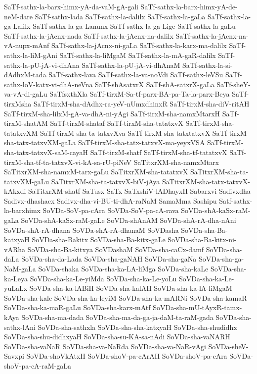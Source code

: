 {SaTf-sathx-la-barx-himx-yA-da-vaM-gA-gali
SaTf-sathx-la-barx-himx-yA-de-neM-dare
SaTf-sathx-lada
SaTf-sathx-la-dalilx
SaTf-sathx-la-gaLa
SaTf-sathx-la-ga-Lalilx
SaTf-sathx-la-ga-Lanunx
SaTf-sathx-la-ga-Lige
SaTf-sathx-la-gaLu
SaTf-sathx-la-jAcnx-nada
SaTf-sathx-la-jAcnx-na-dalilx
SaTf-sathx-la-jAcnx-na-vA-nupx-mAnf
SaTf-sathx-la-jAcnx-ni-gaLa
SaTf-sathx-la-karx-ma-dalilx
SaTf-sathx-la-liM-gAni
SaTf-sathx-la-liMgaM
SaTf-sathx-la-mA-gaR-dalilx
SaTf-sathx-la-pU-jA-vi-dhAna
SaTf-sathx-la-pU-jA-vi-dhAnaM
SaTf-sathx-la-si-dAdhxM-tada
SaTf-sathx-lava
SaTf-sathx-la-va-noVdi
SaTf-sathx-leVSu
SaTf-sathx-loV-katx-vi-dhA-neVna
SaTf-shAsatxrX
SaTf-shA-satxrX-gaLa
SaTf-sheY-va-vA-di-gaLu
SaTfsxthXla
SaTf-tirxM-Sa-tf-parx-BA-pa-Ta-la-parx-Beya
SaTf-tirxMsha
SaTf-tirxM-sha-dAdhx-ra-yeV-nUmxdhinxR
SaTf-tirxM-sha-diV-ritAH
SaTf-tirxM-sha-lilxM-gA-va-dhA-ni-yAgi
SaTf-tirxM-sha-namxMtarxH
SaTf-tirxM-shatAM
SaTf-tirxM-shataf
SaTf-tirxM-sha-tatatxvX
SaTf-tirxM-sha-tatatxvXM
SaTf-tirxM-sha-ta-tatxvXva
SaTf-tirxM-sha-tatxtatxvX
SaTf-tirxM-sha-tatx-tatxvXM-gaLa
SaTf-tirxM-sha-tatx-tatxvX-ma-yeyxVSA
SaTf-tirxM-sha-tatx-tatxvX-saM-cayaH
SaTf-tirxM-shatf
SaTf-tirxM-sha-tf-tatatxvX
SaTf-tirxM-sha-tf-ta-tatxvX-vi-kA-sa-rU-piNeV
SaTitxrXM-sha-namxMtarx
SaTitxrXM-sha-namxM-tarx-gaLu
SaTitxrXM-sha-tatatxvX
SaTitxrXM-sha-ta-tatxvXM-gaLu
SaTitxrXM-sha-ta-tatxvX-biV-jAya
SaTitxrXM-sha-tatx-tatxvX-kAkxdi
SaTitxrXM-shatf
SaTusx
SaTx
SaTxshiV-lADhayxH
Sabarxvi
Sadivxdha
Sadivx-dhashacx
Sadivx-dha-vi-BU-ti-dhA-raNaM
SamaMma
Sashipu
Satf-sathx-la-barxhimx
SoVDa-SoV-pa-cAra
SoVDa-SoV-pa-cA-rava
SoVDa-shA-kaSx-raM-gaLa
SoVDa-shA-kaSx-raM-gaLe
SoVDa-shAnAM
SoVDa-shA-rA-dha-nAni
SoVDa-shA-rA-dhana
SoVDa-shA-rA-dhanaM
SoVDasha
SoVDa-sha-Ba-katxyaH
SoVDa-sha-Bakitx
SoVDa-sha-Ba-kitx-gaLe
SoVDa-sha-Ba-kitx-ni-vARha
SoVDa-sha-Ba-kitxya
SoVDashaM
SoVDa-sha-caCx-damf
SoVDa-sha-daLa
SoVDa-sha-da-Lada
SoVDa-sha-gaNAH
SoVDa-sha-gaNa
SoVDa-sha-ga-NaM-gaLa
SoVDa-shaka
SoVDa-sha-ka-LA-liMga
SoVDa-sha-kaLe
SoVDa-sha-ka-Leya
SoVDa-sha-ka-Le-yiMda
SoVDa-sha-ka-Le-yoLu
SoVDa-sha-ka-Le-yuLaLx
SoVDa-sha-ka-lABiH
SoVDa-sha-kalAH
SoVDa-sha-ka-lA-liMgaM
SoVDa-sha-kale
SoVDa-sha-ka-leyiM
SoVDa-sha-ka-mARNi
SoVDa-sha-kamaR
SoVDa-sha-ka-maR-gaLu
SoVDa-sha-karx-mAtf
SoVDa-sha-mU-tAyxR-tamx-kAya
SoVDa-sha-ma-dada
SoVDa-sha-ma-da-ga-ja-daM-ta-raM-gada
SoVDa-sha-sathx-lAni
SoVDa-sha-sathxla
SoVDa-sha-sha-katxyaH
SoVDa-sha-shudidhx
SoVDa-sha-shu-didhxyaH
SoVDa-sha-su-KA-sa-nAdi
SoVDa-sha-vaNARH
SoVDa-sha-vaNaR
SoVDa-sha-va-NaRda
SoVDa-sha-va-NaR-vAgi
SoVDa-sheV-Savxpi
SoVDa-shoVkAtxH
SoVDa-shoV-pa-cArAH
SoVDa-shoV-pa-cAra
SoVDa-shoV-pa-cA-raM-gaLa
}
